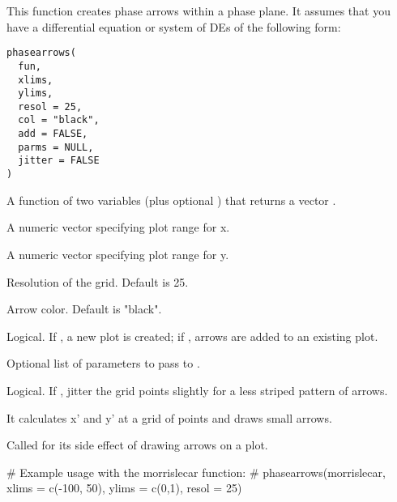 \documentclass[a4paper]{book}
\begin{document}
%
\begin{Description}
This function creates phase arrows within a phase plane. It assumes that you
have a differential equation or system of DEs of the following form:
\end{Description}
%
\begin{Usage}
\begin{verbatim}
phasearrows(
  fun,
  xlims,
  ylims,
  resol = 25,
  col = "black",
  add = FALSE,
  parms = NULL,
  jitter = FALSE
)
\end{verbatim}
\end{Usage}
%
\begin{Arguments}
\begin{ldescription}
\item[\code{fun}] A function of two variables  (plus optional )
that returns a vector .

\item[\code{xlims}] A numeric vector  specifying plot range for x.

\item[\code{ylims}] A numeric vector  specifying plot range for y.

\item[\code{resol}] Resolution of the grid. Default is 25.

\item[\code{col}] Arrow color. Default is "black".

\item[\code{add}] Logical. If , a new plot is created; if , arrows
are added to an existing plot.

\item[\code{parms}] Optional list of parameters to pass to .

\item[\code{jitter}] Logical. If , jitter the grid points slightly for a
less striped pattern of arrows.
\end{ldescription}
\end{Arguments}
%
\begin{Details}

It calculates x' and y' at a grid of points and draws small arrows.
\end{Details}
%
\begin{Value}
Called for its side effect of drawing arrows on a plot.
\end{Value}
%
\begin{Examples}
\begin{ExampleCode}
# Example usage with the morrislecar function:
# phasearrows(morrislecar, xlims = c(-100, 50), ylims = c(0,1), resol = 25)
\end{ExampleCode}
\end{Examples}
\printindex{}
\end{document}

